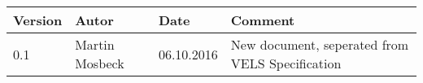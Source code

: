 
\begin{table}[h]
\begin{tabular*}{14.7cm}{|p{}|p{}|p{2cm}|p{}|}
\hline 
Version & Autor & Date & Comment \\[2pt]
\hline
\hline

0.1 & Martin Mosbeck & 06.10.2016& New document, seperated from VELS Specification \\[2pt]
\hline  
\end{tabular*}
\end{table}

